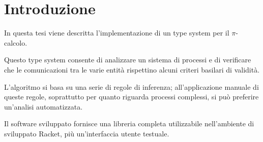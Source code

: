 \chapter{Introduzione}

In questa tesi viene descritta l'implementazione di un type system per
il $\pi$-calcolo.

Questo type system consente di analizzare un sistema di processi e di
verificare che le comunicazioni tra le varie entit\`a rispettino alcuni
criteri basilari di validit\`a.

L'algoritmo si basa su una serie di regole di inferenza; all'applicazione
manuale di queste regole, soprattutto per quanto riguarda processi
complessi, si pu\`o preferire un'analisi automatizzata.

Il software sviluppato fornisce una libreria completa utilizzabile
nell'ambiente di sviluppato Racket, pi\`u un'interfaccia utente testuale.






